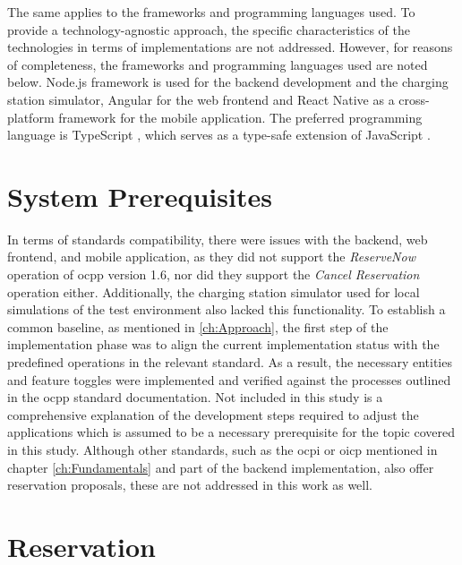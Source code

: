 The same applies to the frameworks and programming languages used. To provide a technology-agnostic approach, the specific characteristics of the technologies in terms of implementations are not addressed.
However, for reasons of completeness, the frameworks and programming languages used are noted below. Node.js framework \cite{noauthor_nodejs_nodate} is used for the backend development and the charging station simulator, Angular \cite{noauthor_angular_nodate} for the web frontend and React Native \cite{noauthor_react_nodate} as a cross-platform framework for the mobile application. The preferred programming language is TypeScript \cite{noauthor_javascript_nodate}, which serves as a type-safe extension of JavaScript \cite{noauthor_javascript_2023}.

\section{System Prerequisites}
\label{ch:Implementation:sec:System Prerequisites}

In terms of standards compatibility, there were issues with the backend, web frontend, and mobile application, as they did not support the \textit{ReserveNow} operation of \acrshort{ocpp} version 1.6, nor did they support the \textit{Cancel Reservation} operation either.
Additionally, the charging station simulator used for local simulations of the test environment also lacked this functionality.
To establish a common baseline, as mentioned in \ref{ch:Approach}, the first step of the implementation phase was to align the current implementation status with the predefined operations in the relevant standard.
As a result, the necessary entities and feature toggles were implemented and verified against the processes outlined in the \acrfull{ocpp} standard documentation.
Not included in this study is a comprehensive explanation of the development steps required to adjust the applications which is assumed to be a necessary prerequisite for the topic covered in this study.
Although other standards, such as the \acrshort{ocpi} or \acrshort{oicp} mentioned in chapter \ref{ch:Fundamentals} and part of the backend implementation, also offer reservation proposals, these are not addressed in this work as well.

\section{Reservation}
\label{ch:Implementation:sec:Reservation}

